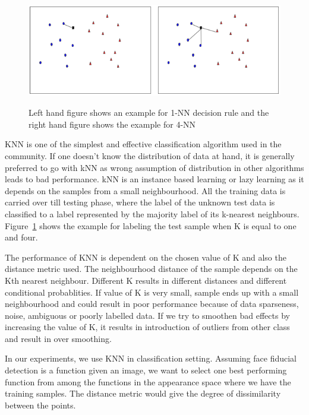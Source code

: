 


\begin{figure}
    \centering
    \includegraphics[width=5in, height=1.6in]{concepts/figures/knn.png}
    \label{fig:knn_example}
    \caption{Left hand figure shows an example for 1-NN decision rule and the right hand figure shows the example for 4-NN}
\end{figure}

KNN is one of the simplest and effective classification algorithm used in the community. 
If one doesn't know the distribution of data at hand, it is generally preferred to go 
with kNN as wrong assumption of distribution in other algorithms leads to bad performance.
kNN is an instance based learning or lazy learning as it depends on the samples from a 
small neighbourhood. All the training data is carried over till testing phase, where the 
label of the unknown test data is classified to a label represented by the majority label
of its k-nearest neighbours. Figure~\ref{fig:knn_example} shows the example for labeling the test sample when
K is equal to one and four.

The performance of KNN is dependent on the chosen value of K and also the distance metric
used. The neighbourhood distance of the sample depends on the Kth nearest neighbour. 
Different K results in different distances and different conditional probablities. If value
of K is very small, sample ends up with a small neighbourhood and could result in poor
performance because of data sparseness, noise, ambiguous or poorly labelled data. If we
try to smoothen bad effects by increasing the value of K, it results in introduction of 
outliers from other class and result in over smoothing.

In our experiments, we use KNN in classification setting. Assuming face fiducial detection
is a function given an image, we want to select one best performing function from among the 
functions in the appearance space where we have the training samples. The distance metric 
would give the degree of dissimilarity between the points.
